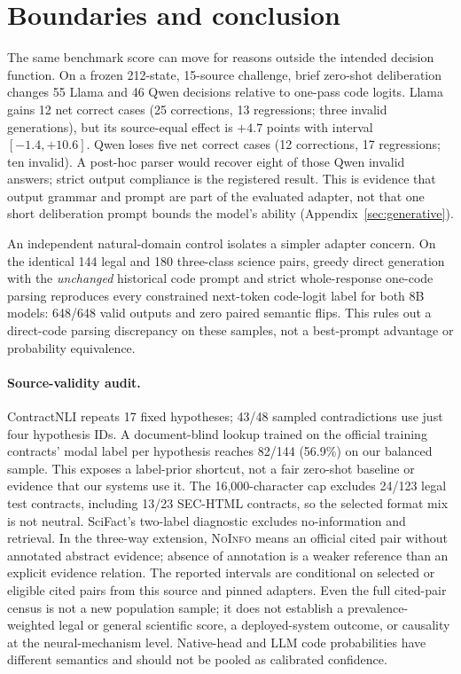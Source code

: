 \section{Boundaries and conclusion}
The same benchmark score can move for reasons outside the intended decision function. On a frozen 212-state, 15-source challenge, brief zero-shot deliberation changes 55 Llama and 46 Qwen decisions relative to one-pass code logits. Llama gains 12 net correct cases (25 corrections, 13 regressions; three invalid generations), but its source-equal effect is $+4.7$ points with interval $[-1.4,+10.6]$. Qwen loses five net correct cases (12 corrections, 17 regressions; ten invalid). A post-hoc parser would recover eight of those Qwen invalid answers; strict output compliance is the registered result. This is evidence that output grammar and prompt are part of the evaluated adapter, not that one short deliberation prompt bounds the model's ability (Appendix~\ref{sec:generative}).

An independent natural-domain control isolates a simpler adapter concern. On the identical 144 legal and 180 three-class science pairs, greedy direct generation with the \emph{unchanged} historical code prompt and strict whole-response one-code parsing reproduces every constrained next-token code-logit label for both 8B models: 648/648 valid outputs and zero paired semantic flips. This rules out a direct-code parsing discrepancy on these samples, not a best-prompt advantage or probability equivalence.

\paragraph{Source-validity audit.} ContractNLI repeats 17 fixed hypotheses; 43/48 sampled contradictions use just four hypothesis IDs. A document-blind lookup trained on the official training contracts' modal label per hypothesis reaches 82/144 (56.9\%) on our balanced sample. This exposes a label-prior shortcut, not a fair zero-shot baseline or evidence that our systems use it. The 16,000-character cap excludes 24/123 legal test contracts, including 13/23 SEC-HTML contracts, so the selected format mix is not neutral. SciFact's two-label diagnostic excludes no-information and retrieval. In the three-way extension, \textsc{NoInfo} means an official cited pair without annotated abstract evidence; absence of annotation is a weaker reference than an explicit evidence relation. The reported intervals are conditional on selected or eligible cited pairs from this source and pinned adapters. Even the full cited-pair census is not a new population sample; it does not establish a prevalence-weighted legal or general scientific score, a deployed-system outcome, or causality at the neural-mechanism level. Native-head and LLM code probabilities have different semantics and should not be pooled as calibrated confidence.


